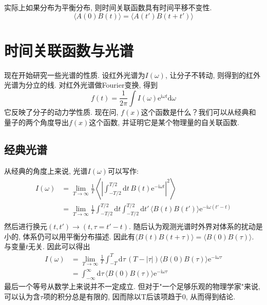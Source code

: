     实际上如果分布为平衡分布, 则时间关联函数具有时间平移不变性. 
    \begin{equation}
        \langle A(0)B(t) \rangle = \langle A(t')B(t+t') \rangle
    \end{equation}

    \section{时间关联函数与光谱}

    现在开始研究一些光谱的性质. 设红外光谱为$I(\omega)$, 让分子不转动, 则得到的红外光谱为分立的线. 对红外光谱做Fourier变换, 得到
    \begin{equation}
        f(t) = \frac{1}{2\pi} \int I(\omega)\mathrm{e}^{\mathrm{i}\omega t}\mathrm{d}\omega 
    \end{equation}
    它反映了分子的动力学性质. 现在问, $f(x)$这个函数是什么？我们可以从经典和量子的两个角度导出$f(x)$这个函数, 并证明它是某个物理量的自关联函数. 

    \subsection{经典光谱}

    从经典的角度上来说, 光谱$I(\omega)$可以写作:
    \begin{equation}\begin{aligned}
        I(\omega) 
        &= \lim_{T\to\infty} \frac 1T \left\langle \left| \int_{-T/2}^{T/2} \mathrm{d}t\, B(t) \mathrm{e}^{-\mathrm{i}\omega t} \right|^2 \right\rangle \\
        &= \lim_{T\to\infty} \frac 1T \int_{-T/2}^{T/2} \mathrm{d}t \int_{-T/2}^{T/2} \mathrm{d}t'\, \langle B(t)B(t') \rangle \mathrm{e}^{-\mathrm{i}\omega (t'-t)} \\
    \end{aligned}\end{equation}
    然后进行换元$(t,t')\to(t, \tau=t'-t)$. 随后认为观测光谱时外界对体系的扰动是小的, 体系仍可以用平衡分布描述. 因此有$\langle B(t)B(t+\tau) \rangle = \langle B(0)B(\tau) \rangle$. 与变量$t$无关. 因此可以得出
    \begin{equation}\begin{aligned}
        I(\omega) 
        &= \lim_{T\to\infty} \frac 1T \int_{-T}^{T} \mathrm{d}\tau\, (T - |\tau|) \langle B(0)B(\tau) \rangle \mathrm{e}^{-\mathrm{i}\omega \tau} \\
        &= \int_{-\infty}^{\infty} \mathrm{d}\tau\, \langle B(0)B(\tau) \rangle \mathrm{e}^{-\mathrm{i}\omega \tau}
    \end{aligned}\end{equation}
    最后一个等号从数学上来说并不一定成立. 但对于"一个足够乐观的物理学家"来说, 可以认为含$\tau$项的积分总是有限的, 因而除以T后该项趋于0, 从而得到结论. 

